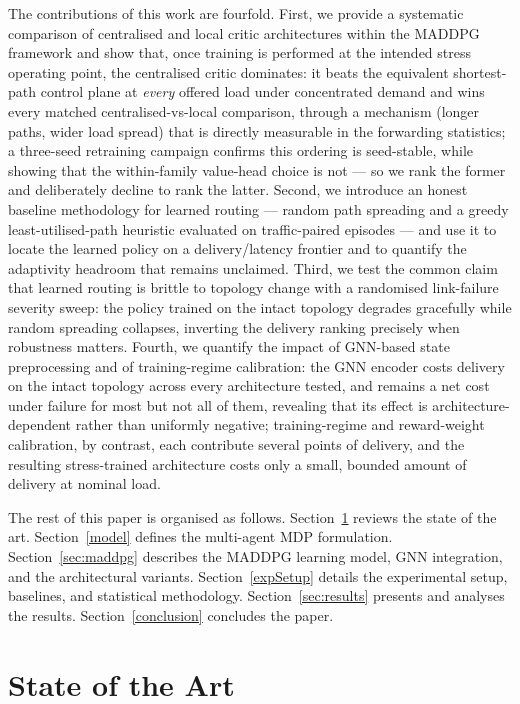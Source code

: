 \documentclass[10pt,journal,comsoc]{IEEEtran}
\begin{document}
The contributions of this work are fourfold. First, we provide a systematic comparison of centralised and local critic architectures within the MADDPG framework and show that, once training is performed at the intended stress operating point, the centralised critic dominates: it beats the equivalent shortest-path control plane at \emph{every} offered load under concentrated demand and wins every matched centralised-vs-local comparison, through a mechanism (longer paths, wider load spread) that is directly measurable in the forwarding statistics; a three-seed retraining campaign confirms this ordering is seed-stable, while showing that the within-family value-head choice is not --- so we rank the former and deliberately decline to rank the latter. Second, we introduce an honest baseline methodology for learned routing --- random path spreading and a greedy least-utilised-path heuristic evaluated on traffic-paired episodes --- and use it to locate the learned policy on a delivery/latency frontier and to quantify the adaptivity headroom that remains unclaimed. Third, we test the common claim that learned routing is brittle to topology change with a randomised link-failure severity sweep: the policy trained on the intact topology degrades gracefully while random spreading collapses, inverting the delivery ranking precisely when robustness matters. Fourth, we quantify the impact of GNN-based state preprocessing and of training-regime calibration: the GNN encoder costs delivery on the intact topology across every architecture tested, and remains a net cost under failure for most but not all of them, revealing that its effect is architecture-dependent rather than uniformly negative; training-regime and reward-weight calibration, by contrast, each contribute several points of delivery, and the resulting stress-trained architecture costs only a small, bounded amount of delivery at nominal load.

The rest of this paper is organised as follows. Section~\ref{State_of_Art} reviews the state of the art. Section~\ref{model} defines the multi-agent MDP formulation. Section~\ref{sec:maddpg} describes the MADDPG learning model, GNN integration, and the architectural variants. Section~\ref{expSetup} details the experimental setup, baselines, and statistical methodology. Section~\ref{sec:results} presents and analyses the results. Section~\ref{conclusion} concludes the paper.

\section{State of the Art} \label{State_of_Art}
\end{document}
